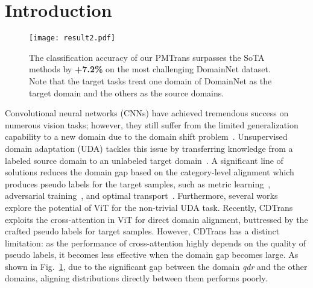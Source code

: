 \documentclass[10pt,twocolumn,letterpaper, ]{article}
\begin{document}
\section{Introduction}
\vspace{-5pt}
\begin{figure}[t]
    \centering
    \captionsetup{font=small}
    \texttt{[image: result2.pdf]}
    \vspace{-8pt}
    \caption{The classification accuracy of our PMTrans surpasses the SoTA methods by \textbf{+7.2\%} on the most challenging DomainNet dataset. Note that the target tasks treat one domain of DomainNet as the target domain and the others as the source domains.}
    \label{fig:result_cover}
    \vspace{-20pt}
\end{figure}
Convolutional neural networks (CNNs) have achieved tremendous success on numerous vision tasks; however, they still suffer from the limited generalization capability to a new domain due to the domain shift problem~\cite{ZhangDTZJ22}. Unsupervised domain adaptation (UDA) tackles this issue by transferring knowledge from a labeled source domain to an unlabeled target domain~\cite{PanY10}. A significant line of solutions reduces the domain gap based on the category-level alignment which produces pseudo labels for the target samples, such as metric learning~\cite{Kang0YH19, ZhuZWKCBXH21}, adversarial training~\cite{SaitoWUH18, Du0S0021, LiL0Y21}, and optimal transport~\cite{XuLWC020}. Furthermore, several works ~\cite{Dosovitskiy2021AnII,abs-2204-07683} explore the potential of ViT for the non-trivial UDA task. Recently, CDTrans \cite{abs-2109-06165} exploits the cross-attention in ViT for direct domain alignment, buttressed by the crafted pseudo labels for target samples. 
However, CDTrans has a distinct limitation: as the performance of cross-attention highly depends on the quality of pseudo labels, it becomes less effective when the domain gap becomes large. 
As shown in Fig.~\ref{fig:result_cover}, due to the significant gap between
the domain \textit{qdr} and the other domains, aligning distributions directly between them performs poorly. 
\end{document}

